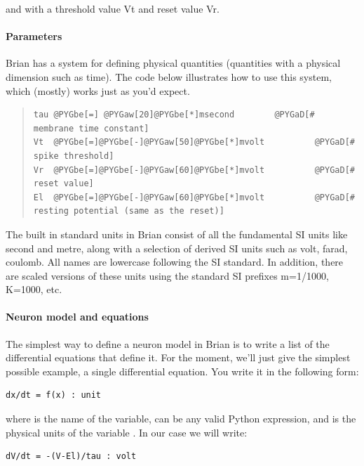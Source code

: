 \documentclass[letterpaper,10pt]{manual}
\begin{document}
and with a threshold value Vt and reset value Vr.


\paragraph{Parameters}

Brian has a system for defining physical quantities (quantities with
a physical dimension such as time). The code below illustrates how
to use this system, which (mostly) works just as you'd expect.
\begin{quote}

\begin{Verbatim}[commandchars=@\[\]]
tau @PYGbe[=] @PYGaw[20]@PYGbe[*]msecond        @PYGaD[# membrane time constant]
Vt  @PYGbe[=]@PYGbe[-]@PYGaw[50]@PYGbe[*]mvolt          @PYGaD[# spike threshold]
Vr  @PYGbe[=]@PYGbe[-]@PYGaw[60]@PYGbe[*]mvolt          @PYGaD[# reset value]
El  @PYGbe[=]@PYGbe[-]@PYGaw[60]@PYGbe[*]mvolt          @PYGaD[# resting potential (same as the reset)]
\end{Verbatim}
\end{quote}

The built in standard units in Brian consist of all the fundamental
SI units like second and metre, along with a selection of derived
SI units such as volt, farad, coulomb. All names are lowercase
following the SI standard. In addition, there are scaled versions
of these units using the standard SI prefixes m=1/1000, K=1000, etc.


\paragraph{Neuron model and equations}

The simplest way to define a neuron model in Brian is to write a list
of the differential equations that define it. For the moment, we'll just
give the simplest possible example, a single differential equation. You
write it in the following form:

\begin{Verbatim}[commandchars=@\[\]]
dx/dt = f(x) : unit
\end{Verbatim}

where  is the name of the variable,  can be any valid Python
expression, and  is the physical units of the variable . In our
case we will write:

\begin{Verbatim}[commandchars=@\[\]]
dV/dt = -(V-El)/tau : volt
\end{Verbatim}
\end{document}
